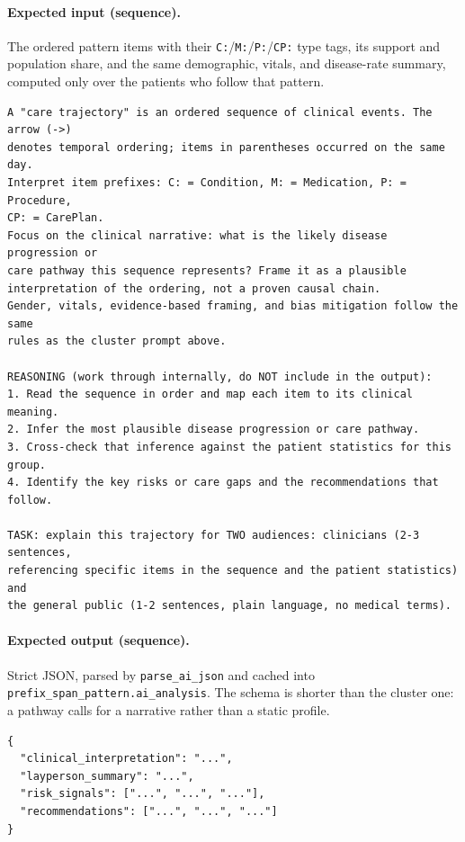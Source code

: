 \paragraph{Expected input (sequence).} The ordered pattern items with their \texttt{C:}/\texttt{M:}/\texttt{P:}/\texttt{CP:} type tags, its support and population share, and the same demographic, vitals, and disease-rate summary, computed only over the patients who follow that pattern.

\vspace{0.25cm}

\begin{lstlisting}[style=pythonstyle]
A "care trajectory" is an ordered sequence of clinical events. The arrow (->)
denotes temporal ordering; items in parentheses occurred on the same day.
Interpret item prefixes: C: = Condition, M: = Medication, P: = Procedure,
CP: = CarePlan.
Focus on the clinical narrative: what is the likely disease progression or
care pathway this sequence represents? Frame it as a plausible
interpretation of the ordering, not a proven causal chain.
Gender, vitals, evidence-based framing, and bias mitigation follow the same
rules as the cluster prompt above.

REASONING (work through internally, do NOT include in the output):
1. Read the sequence in order and map each item to its clinical meaning.
2. Infer the most plausible disease progression or care pathway.
3. Cross-check that inference against the patient statistics for this group.
4. Identify the key risks or care gaps and the recommendations that follow.

TASK: explain this trajectory for TWO audiences: clinicians (2-3 sentences,
referencing specific items in the sequence and the patient statistics) and
the general public (1-2 sentences, plain language, no medical terms).
\end{lstlisting}

\paragraph{Expected output (sequence).} Strict JSON, parsed by \texttt{parse\_ai\_json} and cached into \texttt{prefix\_span\_pattern.ai\_analysis}. The schema is shorter than the cluster one: a pathway calls for a narrative rather than a static profile.

\vspace{0.25cm}

\begin{lstlisting}[style=pythonstyle]
{
  "clinical_interpretation": "...",
  "layperson_summary": "...",
  "risk_signals": ["...", "...", "..."],
  "recommendations": ["...", "...", "..."]
}
\end{lstlisting}

